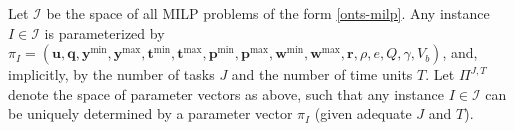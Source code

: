 Let $\mathcal{I}$ be the space of all MILP problems of the form \eqref{onts-milp}.
Any instance $I\in \mathcal{I}$ is parameterized by $\pi_I = \left( \bm{u}, \bm{q}, \bm{y}^{\min}, \bm{y}^{\max}, \bm{t}^{\min}, \bm{t}^{\max}, \bm{p}^{\min}, \bm{p}^{\max}, \bm{w}^{\min}, \bm{w}^{\max}, \bm{r}, \rho, e, Q, \gamma, V_b \right) $, and, implicitly, by the number of tasks $J$ and the number of time units $T$.
Let $\Pi^{J,T}$ denote the space of parameter vectors as above, such that any instance $I\in \mathcal{I}$ can be uniquely determined by a parameter vector $\pi_{I}$ (given adequate $J$ and $T$).


